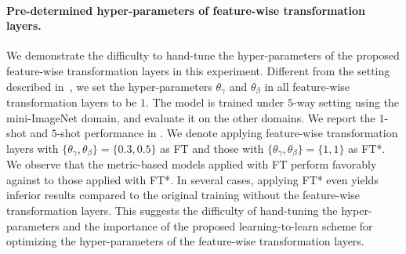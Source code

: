 \paragraph{Pre-determined hyper-parameters of feature-wise transformation layers.}
We demonstrate the difficulty to hand-tune the hyper-parameters of the proposed feature-wise transformation layers in this experiment.
Different from the setting described in~, we set the hyper-parameters $\theta_\gamma$ and $\theta_\beta$ in all feature-wise transformation layers to be $1$.
The model is trained under $5$-way setting using the mini-ImageNet domain, and evaluate it on the other domains.
We report the $1$-shot and $5$-shot performance in .
We denote applying feature-wise transformation layers with $\{\theta_\gamma,\theta_\beta\}=\{0.3,0.5\}$ as FT and those with $\{\theta_\gamma,\theta_\beta\}=\{1,1\}$ as FT*.
We observe that the metric-based models applied with FT perform favorably against to those applied with FT*.
In several cases, applying FT* even yields inferior results compared to the original training without the feature-wise transformation layers.
This suggests the difficulty of hand-tuning the hyper-parameters and the importance of the proposed learning-to-learn scheme for optimizing the hyper-parameters of the feature-wise transformation layers.

